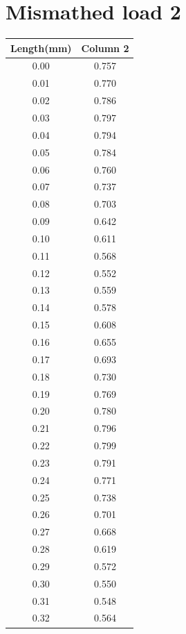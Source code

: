 \documentclass{report}
\begin{document}
    \section{Mismathed load 2}
    \begin{multicols}{2}
    \begin{table}[H]
        \centering
        \begin{tabular}{cc}
        \hline
        Length(mm) & Column 2 \\
        \hline
        0.00 & 0.757 \\
        0.01 & 0.770 \\
        0.02 & 0.786 \\
        0.03 & 0.797 \\
        0.04 & 0.794 \\
        0.05 & 0.784 \\
        0.06 & 0.760 \\
        0.07 & 0.737 \\
        0.08 & 0.703 \\
        0.09 & 0.642 \\
        0.10 & 0.611 \\
        0.11 & 0.568 \\
        0.12 & 0.552 \\
        0.13 & 0.559 \\
        0.14 & 0.578 \\
        0.15 & 0.608 \\
        0.16 & 0.655 \\
        0.17 & 0.693 \\
        0.18 & 0.730 \\
        0.19 & 0.769 \\
        0.20 & 0.780 \\
        0.21 & 0.796 \\
        0.22 & 0.799 \\
        0.23 & 0.791 \\
        0.24 & 0.771 \\
        0.25 & 0.738 \\
        0.26 & 0.701 \\
        0.27 & 0.668 \\
        0.28 & 0.619 \\
        0.29 & 0.572 \\
        0.30 & 0.550 \\
        0.31 & 0.548 \\
        0.32 & 0.564 \\

\end{tabular}
\end{table}
\end{multicols}
\end{document}
